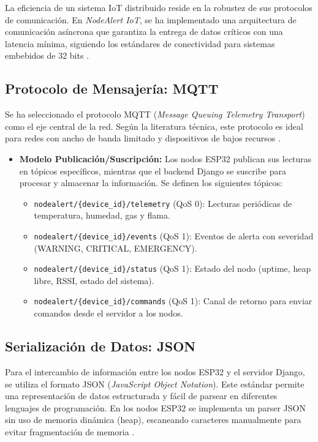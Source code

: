 

La eficiencia de un sistema IoT distribuido reside en la robustez de sus protocolos de comunicación. En \textit{NodeAlert IoT}, se ha implementado una arquitectura de comunicación asíncrona que garantiza la entrega de datos críticos con una latencia mínima, siguiendo los estándares de conectividad para sistemas embebidos de 32 bits \citep{mazidi2014}.

\subsection{Protocolo de Mensajería: MQTT}
Se ha seleccionado el protocolo MQTT (\textit{Message Queuing Telemetry Transport}) como el eje central de la red. Seg\'un la literatura técnica, este protocolo es ideal para redes con ancho de banda limitado y dispositivos de bajos recursos \citep{valvano2014volume2}.
\begin{itemize}
    \item \textbf{Modelo Publicación/Suscripción:} Los nodos ESP32 publican sus lecturas en tópicos específicos, mientras que el backend Django se suscribe para procesar y almacenar la información. Se definen los siguientes tópicos:
    \begin{itemize}
        \item \texttt{nodealert/\{device\_id\}/telemetry} (QoS 0): Lecturas peri\'odicas de temperatura, humedad, gas y flama.
        \item \texttt{nodealert/\{device\_id\}/events} (QoS 1): Eventos de alerta con severidad (WARNING, CRITICAL, EMERGENCY).
        \item \texttt{nodealert/\{device\_id\}/status} (QoS 1): Estado del nodo (uptime, heap libre, RSSI, estado del sistema).
        \item \texttt{nodealert/\{device\_id\}/commands} (QoS 1): Canal de retorno para enviar comandos desde el servidor a los nodos.
    \end{itemize}
\end{itemize}

\subsection{Serialización de Datos: JSON}
Para el intercambio de información entre los nodos ESP32 y el servidor Django, se utiliza el formato JSON (\textit{JavaScript Object Notation}). Este estándar permite una representación de datos estructurada y fácil de parsear en diferentes lenguajes de programación. En los nodos ESP32 se implementa un parser JSON sin uso de memoria dinámica (heap), escaneando caracteres manualmente para evitar fragmentación de memoria \citep{deitel2004}.

